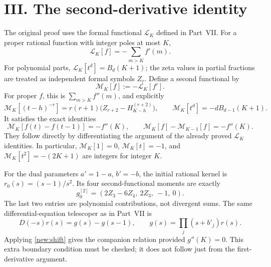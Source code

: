 \documentclass[11pt]{article}
\begin{document}
\section*{III. The second-derivative identity}
The original proof uses the formal functional $\mathcal L_K$ defined in
Part~VII. For a proper rational function with integer poles at most $K$,
\[
 \mathcal L_K[f]=-\sum_{m>K} f'(m).
\]
For polynomial parts, $\mathcal L_K[t^d]=B_d(K+1)$; the zeta values in
partial fractions are treated as independent formal symbols $Z_r$.
Define a second functional by
\[
 \mathcal M_K[f]:=-\mathcal L_K[f'].
\]
For proper $f$, this is $\sum_{m>K}f''(m)$, and explicitly
\[
 \mathcal M_K[(t-h)^{-r}]
 =r(r+1)\bigl(Z_{r+2}-H_{K-h}^{(r+2)}\bigr),\qquad
 \mathcal M_K[t^d]=-dB_{d-1}(K+1).
\]
It satisfies the exact identities
\begin{equation}\label{new:shift}
 \mathcal M_K[f(t)-f(t-1)]=-f''(K),\qquad
 \mathcal M_K[f]-\mathcal M_{K-1}[f]=-f''(K).
\end{equation}
They follow directly by differentiating the argument of the already proved
$\mathcal L_K$ identities. In particular,
$\mathcal M_K[1]=0$, $\mathcal M_K[t]=-1$, and
$\mathcal M_K[t^2]=-(2K+1)$ are integers for integer $K$.

For the dual parameters $a'=1-a$, $b'=-b$, the initial rational kernel is
$r_0(s)=(s-1)/s^2$. Its four second-functional moments are exactly
\begin{equation}\label{new:g0}
 g^{[2]}_0=(2Z_3-6Z_4,\ 2Z_3,\ -1,\ 0).
\end{equation}
The last two entries are polynomial contributions, not divergent sums.
The same differential-equation telescoper as in Part~VII is
\[
 D(-s)r(s)=g(s)-g(s-1),\qquad
 g(s)=\prod_j(s+b'_j)r(s).
\]
Applying \eqref{new:shift} gives the companion relation provided $g''(K)=0$.
This extra boundary condition must be checked; it does not follow just from
the first-derivative argument.
\end{document}

